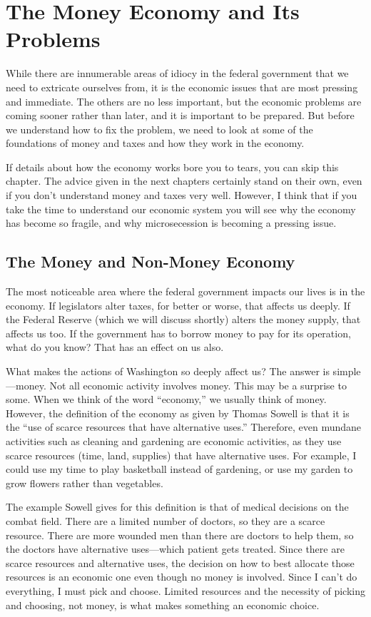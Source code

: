 \chapter{The Money Economy and Its Problems}

While there are innumerable areas of idiocy in the federal government
that we need to extricate ourselves from, it is the economic issues
that are most pressing
and immediate. The
others are no less important, but the economic problems are coming
sooner rather than later, and it is important to be prepared.  But
before we understand how to fix the problem, we need to look at some of
the foundations of money and taxes and how they work in the economy.

If details about how the economy works bore you to tears, you can
skip this chapter.  The advice given in the next chapters certainly
stand on their own, even if you don't understand money and taxes
very well.  However, I think that if you take the time to understand
our economic system you will see why the economy has become so fragile, and
why microsecession is becoming a pressing issue.

\section{The Money and Non-Money Economy}

The most noticeable area where the federal government impacts our lives
is in the economy. If legislators alter taxes, for better or worse,
that affects us deeply. If the Federal Reserve (which we will discuss
shortly) alters the money supply, that affects us too. If the
government has to borrow money to pay for its operation,
what do you know? That
has an effect on us also.

What makes the actions of Washington so deeply affect us?  The answer is
simple—money.  Not all economic activity involves money. This may be a
surprise to some. When we think of the word “economy,” we usually think
of money. However, the definition of the economy as given by Thomas
Sowell is that it is the “use of scarce resources that have alternative
uses.”  Therefore, even mundane activities such as cleaning and
gardening are economic
activities, as they
use scarce resources (time, land, supplies) that have alternative uses.
For example, I could
use my time to play basketball instead of gardening, or use my garden
to grow flowers rather than vegetables.  

The example Sowell gives for this definition
is that of medical decisions on the combat field.  There are a limited
number of doctors, so they are a scarce resource.  There are more wounded
men than there are doctors to help them, so the doctors have alternative
uses---which patient gets treated.  
Since there are scarce resources and alternative uses, the decision
on how to best allocate those resources is an economic one even though
no money is involved.  Since I can't do everything, I must pick and choose.
Limited resources and the necessity of picking and choosing, not money, is what makes
something an economic choice.

